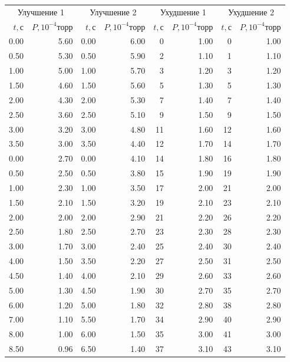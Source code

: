 \documentclass[a4paper, 12pt]{article}
\begin{document}
\begin{table}[!h]
    \begin{center}
    \begin{tabular}{rr|rr|rr|rr}
    \toprule
    \multicolumn{2}{c|}{Улучшение 1} & \multicolumn{2}{c|}{Улучшение 2} & \multicolumn{2}{c|}{Ухудшение 1} & \multicolumn{2}{c}{Ухудшение 2}\\
    $t, с$ &  $P, 10^{-4}торр$ & $t, с$ &  $P, 10^{-4}торр$ & $t, с$ &  $P, 10^{-4}торр$ & $t, с$ &  $P, 10^{-4}торр$\\
    \midrule

	0.00 & 5.60 & 0.00 & 6.00 & 0 & 1.00 & 0 & 1.00 \\
	0.50 & 5.30 & 0.50 & 5.90 & 2 & 1.10 & 1 & 1.10 \\
	1.00 & 5.00 & 1.00 & 5.70 & 3 & 1.20 & 3 & 1.20 \\
	1.50 & 4.60 & 1.50 & 5.60 & 5 & 1.30 & 5 & 1.30 \\
	2.00 & 4.30 & 2.00 & 5.30 & 7 & 1.40 & 7 & 1.40 \\
	2.50 & 3.60 & 2.50 & 5.10 & 9 & 1.50 & 9 & 1.50 \\
	3.00 & 3.20 & 3.00 & 4.80 & 11 & 1.60 & 12 & 1.60 \\
	3.50 & 3.00 & 3.50 & 4.40 & 12 & 1.70 & 14 & 1.70 \\
	0.00 & 2.70 & 0.00 & 4.10 & 14 & 1.80 & 16 & 1.80 \\
	0.50 & 2.50 & 0.50 & 3.80 & 15 & 1.90 & 19 & 1.90 \\
	1.00 & 2.30 & 1.00 & 3.50 & 17 & 2.00 & 21 & 2.00 \\
	1.50 & 2.10 & 1.50 & 3.20 & 19 & 2.10 & 23 & 2.10 \\
	2.00 & 2.00 & 2.00 & 2.90 & 21 & 2.20 & 26 & 2.20 \\
	2.50 & 1.80 & 2.50 & 2.70 & 23 & 2.30 & 28 & 2.30 \\
	3.00 & 1.70 & 3.00 & 2.40 & 25 & 2.40 & 30 & 2.40 \\
	4.00 & 1.50 & 3.50 & 2.20 & 27 & 2.50 & 31 & 2.50 \\
	4.50 & 1.40 & 4.00 & 2.10 & 29 & 2.60 & 33 & 2.60 \\
	5.00 & 1.30 & 4.50 & 1.90 & 30 & 2.70 & 35 & 2.70 \\
	6.00 & 1.20 & 5.00 & 1.80 & 32 & 2.80 & 38 & 2.80 \\
	7.00 & 1.10 & 5.50 & 1.70 & 34 & 2.90 & 40 & 2.90 \\
	8.00 & 1.00 & 6.00 & 1.50 & 35 & 3.00 & 41 & 3.00 \\
	8.50 & 0.96 & 6.50 & 1.40 & 37 & 3.10 & 43 & 3.10 \\

\end{tabular}
\end{center}
\end{table}
\end{document}

